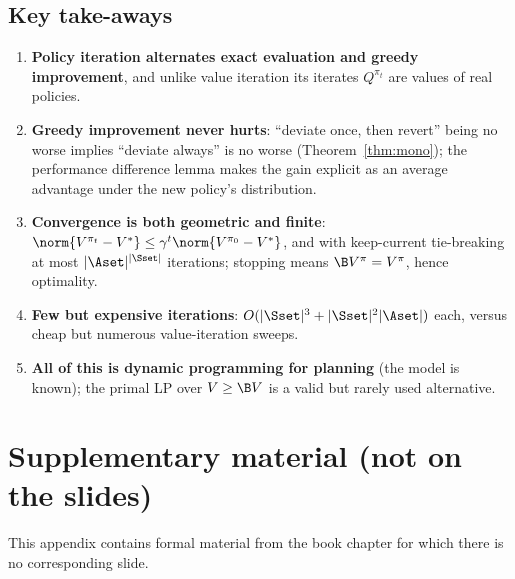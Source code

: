 \documentclass[11pt,a4paper]{article}
\theoremstyle{plain}
\theoremstyle{definition}
\theoremstyle{remark}
\begin{document}
\subsection*{Key take-aways}
\begin{enumerate}[itemsep=2pt]
\item \textbf{Policy iteration alternates exact evaluation and greedy improvement}, and unlike value iteration its iterates $Q^{\pi_t}$ are values of real policies.
\item \textbf{Greedy improvement never hurts}: ``deviate once, then revert'' being no worse implies ``deviate always'' is no worse (Theorem~\ref{thm:mono}); the performance difference lemma makes the gain explicit as an average advantage under the new policy's distribution.
\item \textbf{Convergence is both geometric and finite}: $\norm{V^{\pi_t}-V^*}\le\gamma^t\norm{V^{\pi_0}-V^*}$, and with keep-current tie-breaking at most $|\Aset|^{|\Sset|}$ iterations; stopping means $\B V^{\pi}=V^{\pi}$, hence optimality.
\item \textbf{Few but expensive iterations}: $O(|\Sset|^3+|\Sset|^2|\Aset|)$ each, versus cheap but numerous value-iteration sweeps.
\item \textbf{All of this is dynamic programming for planning} (the model is known); the primal LP over $V\ge\B V$ is a valid but rarely used alternative.
\end{enumerate}

\appendix
\section{Supplementary material (not on the slides)}\label{app:box}
This appendix contains formal material from the book chapter for which there is no corresponding slide.
\end{document}
